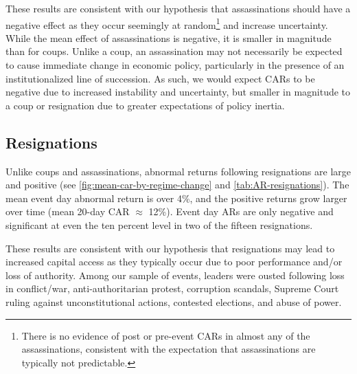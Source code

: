\documentclass[12pt,final,fleqn]{article}
\theoremstyle{plain}
\begin{document}
These results are consistent with our hypothesis that assassinations should have a negative effect as they occur seemingly at random\footnote{There is no evidence of post or pre-event CARs in almost any of the assassinations, consistent with the expectation that assassinations are typically not predictable.} and increase uncertainty. While the mean effect of assassinations is negative, it is smaller in magnitude than for coups. Unlike a coup, an assassination may not necessarily be expected to cause immediate change in economic policy, particularly in the presence of an institutionalized line of succession. As such, we would expect CARs to be negative due to increased instability and uncertainty, but smaller in magnitude to a coup or resignation due to greater expectations of policy inertia.



\subsection{Resignations} \label{subsec: Resignations}

Unlike coups and assassinations, abnormal returns following resignations are large and positive (see \autoref{fig:mean-car-by-regime-change} and \autoref{tab:AR-resignations}). The mean event day abnormal return is over 4\%, and the positive returns grow larger over time (mean 20-day CAR $\approx$ 12\%). Event day ARs are only negative and significant at even the ten percent level in two of the fifteen resignations.

These results are consistent with our hypothesis that resignations may lead to increased capital access as they typically occur due to poor performance and/or loss of authority. Among our sample of events, leaders were ousted following loss in conflict/war, anti-authoritarian protest, corruption scandals, Supreme Court ruling against unconstitutional actions, contested elections, and abuse of power. 

\end{document}
